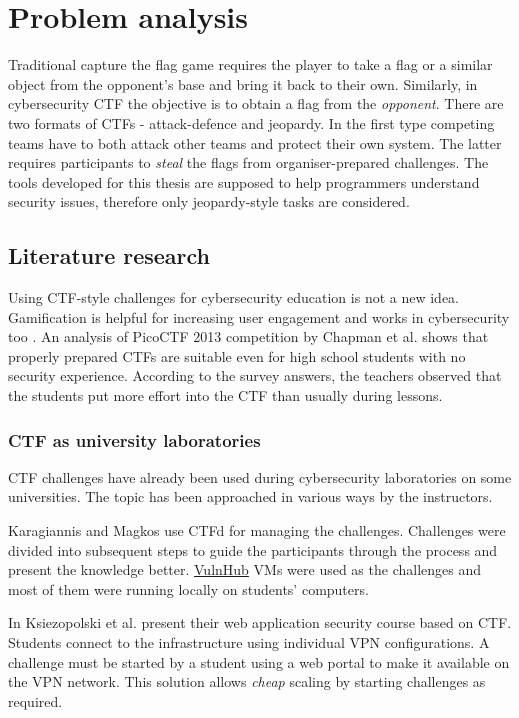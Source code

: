 \chapter{Problem analysis}

Traditional capture the flag game requires the player to take a flag or a similar object from the opponent's base and bring it back to their own. Similarly, in cybersecurity CTF the objective is to obtain a flag from the \textit{opponent}. There are two formats of CTFs - attack-defence and jeopardy. In the first type competing teams have to both attack other teams and protect their own system. The latter requires participants to \textit{steal} the flags from organiser-prepared challenges. The tools developed for this thesis are supposed to help programmers understand security issues, therefore only jeopardy-style tasks are considered.

\section{Literature research}

Using CTF-style challenges for cybersecurity education is not a new idea. Gamification is helpful for increasing user engagement and works in cybersecurity too \cite{bib:exploring-game-design}. An analysis of PicoCTF 2013 competition by Chapman et al. \cite{bib:picoCTF} shows that properly prepared CTFs are suitable even for high school students with no security experience. According to the survey answers, the teachers observed that the students put more effort into the CTF than usually during lessons.

\subsection{CTF as university laboratories}

CTF challenges have already been used during cybersecurity laboratories on some universities. The topic has been approached in various ways by the instructors.

Karagiannis and Magkos \cite{bib:Karagiannis2021} use CTFd for managing the challenges. Challenges were divided into subsequent steps to guide the participants through the process and present the knowledge better. \href{https://vulnhub.com/}{VulnHub} VMs were used as the challenges and most of them were running locally on students' computers.

In \cite{bib:teaching-ctf-PL} Ksiezopolski et al. present their web application security course based on CTF. Students connect to the infrastructure using individual VPN configurations. A challenge must be started by a student using a web portal to make it available on the VPN network. This solution allows \textit{cheap} scaling by starting challenges as required.

